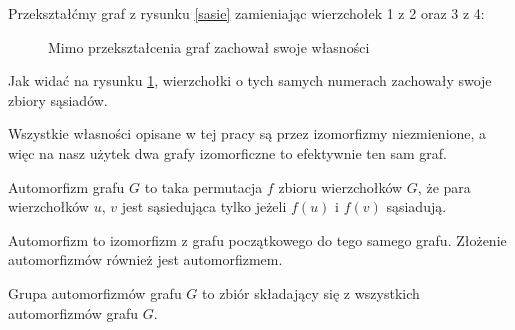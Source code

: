   Przekształćmy graf z rysunku \ref{sasie} zamieniając wierzchołek 1 z 2 oraz 3 z 4:
  \begin{figure}[H]
    \centering
    \hspace{15mm}
    \caption{Mimo przekształcenia graf zachował swoje własności}
    \label{sasieizo}
  \end{figure}

  Jak widać na rysunku \ref{sasieizo}, wierzchołki o tych samych numerach zachowały swoje zbiory sąsiadów. 

  Wszystkie własności opisane w tej pracy są przez izomorfizmy niezmienione, a więc na nasz użytek dwa grafy izomorficzne to efektywnie ten sam graf.


  \begin{definition}
    Automorfizm grafu $G$ to taka permutacja $f$ zbioru wierzchołków $G$, że para wierzchołków $u$, $v$ jest sąsiedująca tylko jeżeli $f(u)$ i $f(v)$ sąsiadują. 
  \end{definition}
  Automorfizm to izomorfizm z grafu początkowego do tego samego grafu. 
  Złożenie automorfizmów również jest automorfizmem.  

  \begin{definition}
    Grupa automorfizmów grafu $G$ to zbiór składający się z wszystkich automorfizmów grafu $G$.
  \end{definition}

